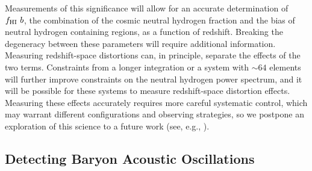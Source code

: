 \documentclass[10pt,iop]{emulateapj}
\begin{document}
Measurements of this significance will allow for an accurate determination of $f_{\rm HI}~b$, 
the combination of the cosmic neutral
hydrogen fraction and the bias of neutral hydrogen containing regions, as a function of redshift.  Breaking the degeneracy between these parameters will require
additional information.  Measuring redshift-space distortions can, in principle,
separate the effects of the two terms.
Constraints from a longer integration or a system with $\sim 64$ elements
will further improve constraints on the neutral hydrogen power spectrum, and it will be possible
for these systems to measure redshift-space distortion effects.  
Measuring 
these effects accurately requires more careful systematic control, which may
warrant different configurations and observing strategies, so we postpone an 
exploration of this science to a future work (see, e.g., \citealt{masui_et_al_2010}).

\subsection{Detecting Baryon Acoustic Oscillations}
\label{sec:baobab128}
\end{document}
